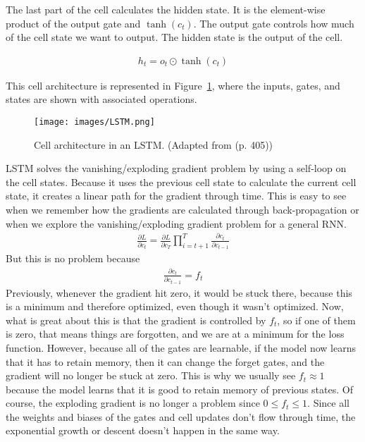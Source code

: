 \documentclass[a4paper,12pt]{article}
\begin{document}
The last part of the cell calculates the hidden state. It is the element-wise product of the output gate and $\tanh(c_t)$. The output gate controls how much of the cell state we want to output. The hidden state is the output of the cell.


\begin{align}
h_t = o_t \odot \tanh(c_t)
\end{align}


This cell architecture is represented in Figure~\ref{fig:n5}, where the inputs, gates, and states are shown with associated operations.
\begin{figure}[H]
\centering
\texttt{[image: images/LSTM.png]}
\caption{Cell architecture in an LSTM. (Adapted from \cite{Goodfellow-et-al-2016} (p. 405))} %
\label{fig:n5}
\end{figure}
LSTM solves the vanishing/exploding gradient problem by using a self-loop on the cell states. Because it uses the previous cell state to calculate the current cell state, it creates a linear path for the gradient through time. This is easy to see when we remember how the gradients are calculated through back-propagation or when we explore the vanishing/exploding gradient problem for a general RNN.
\begin{align}
\frac{\partial L}{\partial c_t} = \frac{\partial L}{\partial c_T} \prod_{i=t+1}^{T} \frac{\partial c_t}{\partial c_{t-1}}
\end{align}
But this is no problem because
\begin{align}
\frac{\partial c_t}{\partial c_{t-1}} = f_t
\end{align}
Previously, whenever the gradient hit zero, it would be stuck there, because this is a minimum and therefore optimized, even though it wasn't optimized. Now, what is great about this is that the gradient is controlled by $f_t$, so if one of them is zero, that means things are forgotten, and we are at a minimum for the loss function.
However, because all of the gates are learnable, if the model now learns that it has to retain memory, then it can change the forget gates, and the gradient will no longer be stuck at zero. This is why we usually see $f_t \approx 1$ because the model learns that it is good to retain memory of previous states.
Of course, the exploding gradient is no longer a problem since $0\leq f_t \leq 1$. Since all the weights and biases of the gates and cell updates don't flow through time, the exponential growth or descent doesn't happen in the same way.
\end{document}
